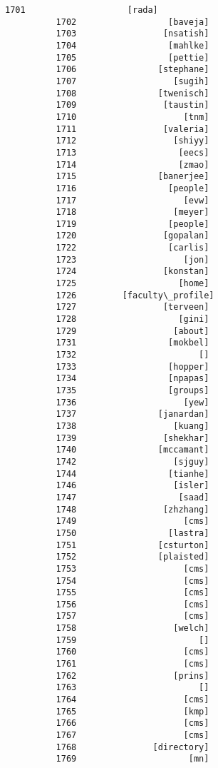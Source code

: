 \documentclass[11pt]{article}
\begin{document}
\begin{Verbatim}[commandchars=\\\{\}]
          1701                    [rada]
          1702                  [baveja]
          1703                 [nsatish]
          1704                  [mahlke]
          1705                  [pettie]
          1706                [stephane]
          1707                   [sugih]
          1708                [twenisch]
          1709                 [taustin]
          1710                     [tnm]
          1711                 [valeria]
          1712                   [shiyy]
          1713                    [eecs]
          1714                    [zmao]
          1715                [banerjee]
          1716                  [people]
          1717                     [evw]
          1718                   [meyer]
          1719                  [people]
          1720                 [gopalan]
          1722                  [carlis]
          1723                     [jon]
          1724                 [konstan]
          1725                    [home]
          1726         [faculty\_profile]
          1727                 [terveen]
          1728                    [gini]
          1729                   [about]
          1731                  [mokbel]
          1732                        []
          1733                  [hopper]
          1734                  [npapas]
          1735                  [groups]
          1736                     [yew]
          1737                [janardan]
          1738                   [kuang]
          1739                 [shekhar]
          1740                [mccamant]
          1742                   [sjguy]
          1744                  [tianhe]
          1746                   [isler]
          1747                    [saad]
          1748                 [zhzhang]
          1749                     [cms]
          1750                  [lastra]
          1751                [csturton]
          1752                [plaisted]
          1753                     [cms]
          1754                     [cms]
          1755                     [cms]
          1756                     [cms]
          1757                     [cms]
          1758                   [welch]
          1759                        []
          1760                     [cms]
          1761                     [cms]
          1762                   [prins]
          1763                        []
          1764                     [cms]
          1765                     [kmp]
          1766                     [cms]
          1767                     [cms]
          1768               [directory]
          1769                      [mn]

\end{Verbatim}
\end{document}
